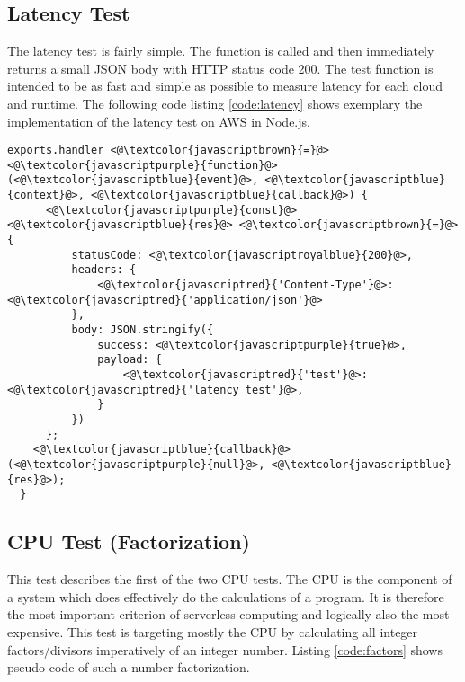 \subsection{Latency Test}
\label{subsec:latency}
The latency test  is fairly simple. The function is called and then immediately returns a small \gls{JSON} body with \gls{HTTP} status code 200. The test function is intended to be as fast and simple as possible to measure latency for each cloud and runtime. The following code listing \ref{code:latency} shows exemplary the implementation of the latency test on \gls{AWS} in Node.js.

\begin{minipage}{\linewidth}
\begin{lstlisting}[frame=single,caption={Latency test implementation on AWS in Node.js},label=code:latency,linewidth=.82\textwidth,xleftmargin=.18\textwidth]
  exports.handler <@\textcolor{javascriptbrown}{=}@> <@\textcolor{javascriptpurple}{function}@>(<@\textcolor{javascriptblue}{event}@>, <@\textcolor{javascriptblue}{context}@>, <@\textcolor{javascriptblue}{callback}@>) {
      <@\textcolor{javascriptpurple}{const}@> <@\textcolor{javascriptblue}{res}@> <@\textcolor{javascriptbrown}{=}@> {
          statusCode: <@\textcolor{javascriptroyalblue}{200}@>,
          headers: {
              <@\textcolor{javascriptred}{'Content-Type'}@>: <@\textcolor{javascriptred}{'application/json'}@>
          },
          body: JSON.stringify({
              success: <@\textcolor{javascriptpurple}{true}@>,
              payload: {
                  <@\textcolor{javascriptred}{'test'}@>: <@\textcolor{javascriptred}{'latency test'}@>,
              }
          })
      };
    <@\textcolor{javascriptblue}{callback}@>(<@\textcolor{javascriptpurple}{null}@>, <@\textcolor{javascriptblue}{res}@>);
  }
\end{lstlisting}
\end{minipage}

\subsection{CPU Test (Factorization)}
\label{sec:factors_test}
This test describes the first of the two \gls{CPU} tests. The \gls{CPU} is the component of a system which does effectively do the calculations of a program. It is therefore the most important criterion of serverless computing and logically also the most expensive. This test is targeting mostly the \gls{CPU} by calculating all integer factors/divisors imperatively of an integer number. Listing \ref{code:factors} shows pseudo code of such a number factorization.


